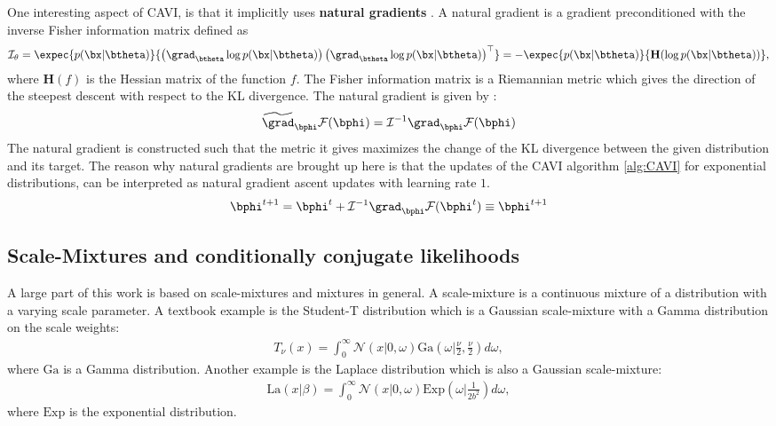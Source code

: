 One interesting aspect of \ac{CAVI}, is that it implicitly uses \textbf{natural gradients} \cite{amariNaturalGradientWorks1998}.
A natural gradient is a gradient preconditioned with the inverse Fisher information matrix defined as
\begin{align}
    \mathcal{I}_\theta = \expec{p(\bx|\btheta)}{\left(\grad_{\btheta}\log p(\bx|\btheta)\right)\left(\grad_{\btheta} \log p(\bx|\btheta)\right)^\top} = -\expec{p(\bx|\btheta)}{\mathbf{H}(\log p(\bx|\btheta))},
    \label{eq:fisherinfomatrix}
\end{align}
where $\mathbf{H}(f)$ is the Hessian matrix of the function $f$.
The Fisher information matrix is a Riemannian metric which gives the direction of the steepest descent with respect to the KL divergence.
The natural gradient is given by :
\begin{align*}
    \widetilde{\grad}_{\bphi}\mathcal{F}(\bphi) = \mathcal{I}^{-1} \grad_{\bphi}\mathcal{F}(\bphi)
\end{align*}
The natural gradient is constructed such that the metric it gives maximizes the change of the \ac{KL} divergence between the given distribution and its target.
The reason why natural gradients are brought up here is that the updates of the \ac{CAVI} algorithm \ref{alg:CAVI} for exponential distributions, can be interpreted as natural gradient ascent updates with learning rate $1$.
\begin{align*}
    \bphi^{t+1} = \bphi^t + \mathcal{I}^{-1}\grad_{\bphi}\mathcal{F}(\bphi^t) \equiv \bphi^{t+1}
\end{align*}


\subsection{Scale-Mixtures and conditionally conjugate likelihoods}
\label{sec:scale-mixtures}
A large part of this work is based on scale-mixtures and mixtures in general.
A scale-mixture is a continuous mixture of a distribution with a varying scale parameter.
A textbook example is the Student-T distribution which is a Gaussian scale-mixture with a Gamma distribution on the scale weights:
\begin{align*}
    T_\nu(x) = \int_{0}^\infty \mathcal{N}\left(x|0,\omega\right)\mathrm{Ga}\left(\omega|\frac{\nu}{2}, \frac{\nu}{2}\right)d\omega,
\end{align*}
where $\mathrm{Ga}$ is a Gamma distribution.
Another example is the Laplace distribution which is also a Gaussian scale-mixture:
\begin{align*}
    \mathrm{La}(x|\beta) = \int_0^{\infty} \mathcal{N}(x|0,\omega)\mathrm{Exp}\left(\omega|\frac{1}{2b^2}\right)d\omega,
\end{align*}
where $\mathrm{Exp}$ is the exponential distribution.

